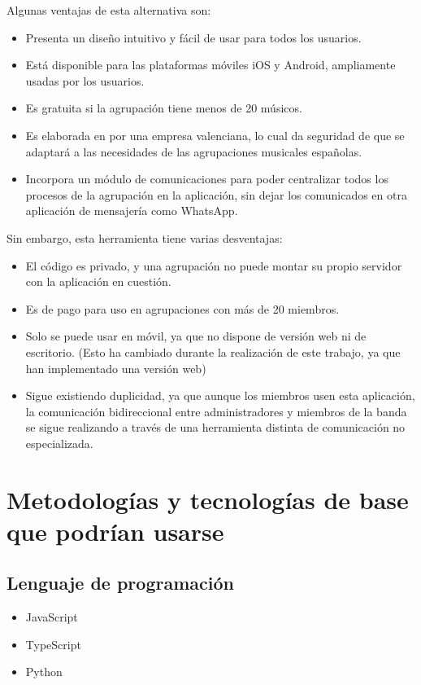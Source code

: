 Algunas ventajas de esta alternativa son:

\begin{itemize}
    \item Presenta un diseño intuitivo y fácil de usar para todos los usuarios.
    \item Está disponible para las plataformas móviles iOS y Android, ampliamente usadas por los usuarios.
    \item Es gratuita si la agrupación tiene menos de 20 músicos.
    \item Es elaborada en por una empresa valenciana, lo cual da seguridad de que se adaptará a las necesidades de las agrupaciones musicales españolas.
    \item Incorpora un módulo de comunicaciones para poder centralizar todos los procesos de la agrupación en la aplicación, sin dejar los comunicados en otra aplicación de mensajería como WhatsApp.
\end{itemize}

Sin embargo, esta herramienta tiene varias desventajas:

\begin{itemize}
    \item El código es privado, y una agrupación no puede montar su propio servidor con la aplicación en cuestión.
    \item Es de pago para uso en agrupaciones con más de 20 miembros.
    \item Solo se puede usar en móvil, ya que no dispone de versión web ni de escritorio. (Esto ha cambiado durante la realización de este trabajo, ya que han implementado una versión web)
    \item Sigue existiendo duplicidad, ya que aunque los miembros usen esta aplicación, la comunicación bidireccional entre administradores y miembros de la banda se sigue realizando a través de una herramienta distinta de comunicación no especializada.
\end{itemize}


\section{Metodologías y tecnologías de base que podrían usarse}

\subsection{Lenguaje de programación}

\begin{itemize}
    \item JavaScript
    \item TypeScript
    \item Python
\end{itemize}

